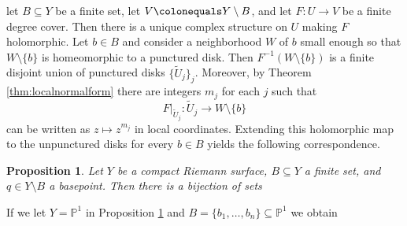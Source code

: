 \documentclass{dcthesis}
\newcommand{\PP}{\mathbb P}
\newcommand{\wt}[1]{\widetilde{#1}}
\newcommand{\sm}{\setminus}
\numberwithin{equation}{section}
\newtheorem{prop}[equation]{Proposition}
\theoremstyle{definition}
\theoremstyle{remark}
\begin{document}
{{    let $B\subseteq Y$ be a finite set,
    let $V\colonequals Y\sm B$,
    and let $F\colon U\to V$ be a finite degree cover.
    Then there is a unique complex structure on $U$
    making $F$ holomorphic.
    Let $b\in B$
    and consider a neighborhood $W$ of $b$
    small enough so that $W\sm \{b\}$ is homeomorphic to a punctured disk.
    Then $F^{-1}(W\sm \{b\})$ is a finite disjoint union
    of punctured disks $\{\wt{U}_j\}_j$.
    Moreover,
    by Theorem \ref{thm:localnormalform}
    there are integers $m_j$ for each $j$ such that
    \[
      F|_{\wt{U}_j}\colon\wt{U}_j\to W\sm \{b\}
    \]
    can be written as $z\mapsto z^{m_j}$ in local coordinates.
    Extending this holomorphic map to the unpunctured disks
    for every $b\in B$ yields the following correspondence.
    \begin{prop}
      \label{prop:branchedcoverofriemannsurfaces}
      Let $Y$ be a compact Riemann surface,
      $B\subseteq Y$ a finite set,
      and $q\in Y\sm B$ a basepoint.
      Then there is a bijection of sets
      \begin{center}
      \end{center}
    \end{prop}
    If we let $Y = \PP^1$ in Proposition \ref{prop:branchedcoverofriemannsurfaces}
    and $B = \{b_1,\ldots,b_n\}\subseteq\PP^1$ we obtain
}}
\end{document}
